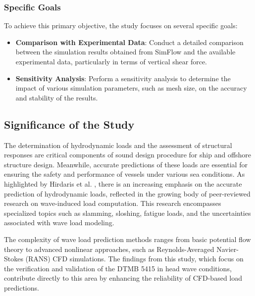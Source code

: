 \documentclass[12pt]{article} %
\begin{document}
\subsubsection{Specific Goals}
To achieve this primary objective, the study focuses on several specific goals:
\begin{itemize}
    \item \textbf{Comparison with Experimental Data}: Conduct a detailed comparison between the 
    simulation results obtained from SimFlow and the available experimental data, particularly 
    in terms of vertical shear force.
    \item \textbf{Sensitivity Analysis}: Perform a sensitivity analysis to determine the impact 
    of various simulation parameters, such as mesh size, on the accuracy and stability of the results.
\end{itemize}

\subsection{Significance of the Study}
The determination of hydrodynamic loads and the assessment of structural responses are critical 
components of sound design procedure for ship and offshore structure design\cite{offshorehydrodynamics}. Meanwhile, accurate predictions of these 
loads are essential for ensuring the safety and performance of vessels under various sea conditions. 
As highlighted by Hirdaris et al. \cite{Hirdaris2014}, there is an increasing emphasis on the accurate 
prediction of hydrodynamic loads, reflected in the growing body of peer-reviewed research on wave-induced 
load computation. This research encompasses specialized topics such as slamming, sloshing, fatigue loads, 
and the uncertainties associated with wave load modeling.

The complexity of wave load prediction methods ranges from basic potential flow theory to advanced 
nonlinear approaches, such as Reynolds-Averaged Navier-Stokes (RANS) CFD simulations. The findings 
from this study, which focus on the verification and validation of the DTMB 5415 in head wave conditions, 
contribute directly to this area by enhancing the reliability of CFD-based load predictions.
\end{document}
